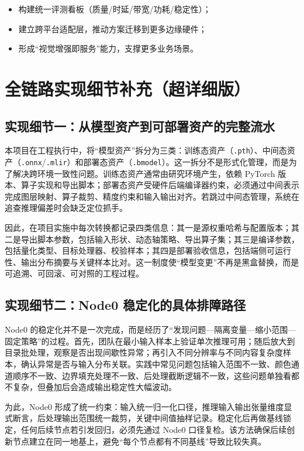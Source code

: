 \documentclass[12pt,a4paper]{ctexart}
\begin{document}
\begin{itemize}
  \item 构建统一评测看板（质量/时延/带宽/功耗/稳定性）；
  \item 建立跨平台适配层，推动方案迁移到更多边缘硬件；
  \item 形成“视觉增强即服务”能力，支撑更多业务场景。
\end{itemize}

\section{全链路实现细节补充（超详细版）}

\subsection{实现细节一：从模型资产到可部署资产的完整流水}

本项目在工程执行中，将“模型资产”拆分为三类：训练态资产（\texttt{.pth}）、中间态资产（\texttt{.onnx}/\texttt{.mlir}）和部署态资产（\texttt{.bmodel}）。这一拆分不是形式化管理，而是为了解决跨环境一致性问题。训练态资产通常由研究环境产生，依赖 PyTorch 版本、算子实现和导出脚本；部署态资产受硬件后端编译器约束，必须通过中间表示完成图层映射、算子裁剪、精度约束和输入输出对齐。若跳过中间态管理，系统在追查推理偏差时会缺乏定位抓手。

因此，在项目实施中每次转换都记录四类信息：其一是源权重哈希与配置版本；其二是导出脚本参数，包括输入形状、动态轴策略、导出算子集；其三是编译参数，包括量化类型、目标处理器、校验样本；其四是部署验收信息，包括端侧可运行性、输出分布摘要与关键样本比对。这一制度使“模型变更”不再是黑盒替换，而是可追溯、可回滚、可对照的工程过程。

\subsection{实现细节二：Node0 稳定化的具体排障路径}

Node0 的稳定化并不是一次完成，而是经历了“发现问题—隔离变量—缩小范围—固定策略”的过程。首先，团队在最小输入样本上验证单次推理可用；随后放大到目录批处理，观察是否出现间歇性异常；再引入不同分辨率与不同内容复杂度样本，确认异常是否与输入分布关联。实践中常见问题包括输入范围不一致、颜色通道顺序不一致、边界填充处理不一致、后处理截断逻辑不一致，这些问题单独看都不复杂，但叠加后会造成输出稳定性大幅波动。

为此，Node0 形成了统一约束：输入统一归一化口径，推理输入输出张量维度显式断言，后处理输出范围统一裁剪，关键中间值抽样记录。稳定化后再做基线锁定，任何后续节点若引发回归，必须先通过 Node0 口径复检。该方法确保后续创新节点建立在同一地基上，避免“每个节点都有不同基线”导致比较失真。
\end{document}
